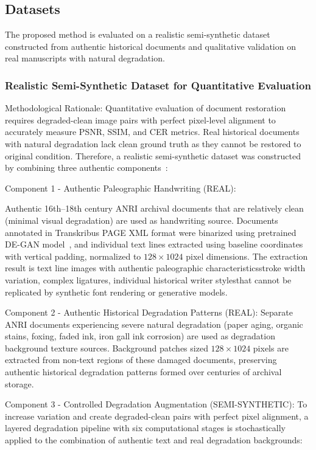 \documentclass[journal]{IEEEtran}
\begin{document}
\subsection{Datasets}

The proposed method is evaluated on a realistic semi-synthetic dataset constructed from authentic historical documents and qualitative validation on real manuscripts with natural degradation.

\subsubsection{Realistic Semi-Synthetic Dataset for Quantitative Evaluation}

Methodological Rationale: Quantitative evaluation of document restoration requires degraded-clean image pairs with perfect pixel-level alignment to accurately measure PSNR, SSIM, and CER metrics. Real historical documents with natural degradation lack clean ground truth as they cannot be restored to original condition. Therefore, a realistic semi-synthetic dataset was constructed by combining three authentic components~\cite{souibgui2021enhance,zhao2019document}:

Component 1 - Authentic Paleographic Handwriting (REAL):

Authentic 16th--18th century ANRI archival documents that are relatively clean (minimal visual degradation) are used as handwriting source. Documents annotated in Transkribus PAGE XML format were binarized using pretrained DE-GAN model~\cite{souibgui2020degan}, and individual text lines extracted using baseline coordinates with vertical padding, normalized to $128 \times 1024$ pixel dimensions. The extraction result is text line images with authentic paleographic characteristics\textemdash stroke width variation, complex ligatures, individual historical writer styles\textemdash that cannot be replicated by synthetic font rendering or generative models.

Component 2 - Authentic Historical Degradation Patterns (REAL):
Separate ANRI documents experiencing severe natural degradation (paper aging, organic stains, foxing, faded ink, iron gall ink corrosion) are used as degradation background texture sources. Background patches sized $128 \times 1024$ pixels are extracted from non-text regions of these damaged documents, preserving authentic historical degradation patterns formed over centuries of archival storage.

Component 3 - Controlled Degradation Augmentation (SEMI-SYNTHETIC):
To increase variation and create degraded-clean pairs with perfect pixel alignment, a layered degradation pipeline with six computational stages is stochastically applied to the combination of authentic text and real degradation backgrounds:
\end{document}
